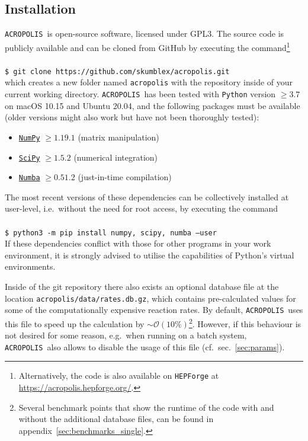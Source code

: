 \documentclass[11pt,a4paper]{article}
\newcommand{\cmd}[1]{\vspace{0.3cm}\texttt{\$ #1}\\[0.3cm]}
\newcommand{\acropolis}{\texttt{ACROPOLIS}~}
\begin{document}
\subsection{Installation}
\acropolis is open-source software, licensed under GPL3. The source code is publicly available and can be cloned from GitHub by executing the command\footnote{Alternatively, the code is also available on \texttt{HEPForge} at \url{https://acropolis.hepforge.org/}.}\\\\
\cmd{git clone https://github.com/skumblex/acropolis.git}
which creates a new folder named \texttt{acropolis} with the repository inside of your current working directory.
\acropolis has been tested with \texttt{Python} version $\geq 3.7$ on macOS 10.15 and Ubuntu 20.04, and the following packages must be available (older versions might also work but have not been thoroughly tested):
\begin{itemize}
	\item \href{https://numpy.org/}{\texttt{NumPy}} $\geq 1.19.1$ (matrix manipulation)
	\item \href{https://www.scipy.org/}{\texttt{SciPy}} $\geq 1.5.2$ (numerical integration)
	\item \href{https://numba.pydata.org/}{\texttt{Numba}} $\geq 0.51.2$ (just-in-time compilation)
\end{itemize}
The most recent versions of these dependencies can be collectively installed at user-level, i.e.\ without the need for root access, by executing the command\\\\
\cmd{python3 -m pip install numpy, scipy, numba --user}
If these dependencies conflict with those for other programs in your work environment, it is strongly advised to utilise the capabilities of Python's virtual environments.

Inside of the git repository there also exists an optional database file at the location \texttt{acropolis/data/rates.db.gz}, which contains pre-calculated values for some of the computationally expensive reaction rates. By default, \acropolis uses this file to speed up the calculation by $\sim \mathcal{O}(10\%)$\footnote{Several benchmark points that show the runtime of the code with and without the additional database files, can be found in appendix~\ref{sec:benchmarks_single}.}. However, if this behaviour is not desired for some reason, e.g.\ when running on a batch system, \acropolis also allows to disable the usage of this file (cf.~sec.~\ref{sec:params}).
\end{document}

